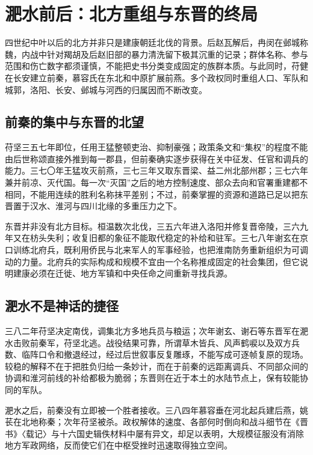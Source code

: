\section{淝水前后：北方重组与东晋的终局}
\label{sec:eastern-jin-fei-river-liu-yu}

四世纪中叶以后的北方并非只是建康朝廷北伐的背景。后赵瓦解后，冉闵在邺城称魏，内战中针对羯胡及后赵旧部的暴力清洗留下极其沉重的记录；群体名称、参与范围和伤亡数字都须谨慎，不能把史书分类变成固定的族群本质。与此同时，苻健在长安建立前秦，慕容氏在东北和中原扩展前燕。多个政权同时重组人口、军队和城郭，洛阳、长安、邺城与河西的归属因而不断改变。

\subsection{前秦的集中与东晋的北望}

苻坚三五七年即位，任用王猛整顿吏治、抑制豪强；政策条文和“集权”的程度不能由后世称颂直接外推到每一郡县，但前秦确实逐步获得在关中征发、任官和调兵的能力。三七〇年王猛攻灭前燕，三七三年又取东晋梁、益二州北部州郡；三七六年兼并前凉、灭代国。每一次“灭国”之后的地方控制速度、部众去向和官署重建都不相同，不能用连续的胜利名称抹平差别；不过，前秦掌握的资源和道路已足以把东晋置于汉水、淮河与四川北缘的多重压力之下。

东晋并非没有北方目标。桓温数次北伐，三五六年进入洛阳并修复晋帝陵，三六九年又在枋头失利；收复旧都的象征不能取代稳定的补给和驻军。三七八年谢玄在京口训练北府兵，既利用侨民与北来军人的军事经验，也把淮南防务重新组织为可调动的力量。北府兵的实际构成和规模不宜由一个名称推成固定的社会集团，但它说明建康必须在迁徙、地方军镇和中央任命之间重新寻找兵源。

\subsection{淝水不是神话的捷径}

三八二年苻坚决定南伐，调集北方多地兵员与粮运；次年谢玄、谢石等东晋军在淝水击败前秦军，苻坚北逃。战役结果可靠，所谓草木皆兵、风声鹤唳以及双方兵数、临阵口令和撤退经过，经过后世叙事反复雕琢，不能写成可逐帧复原的现场。较稳的解释不在于把胜负归给一条妙计，而在于前秦的远距离调兵、不同部众间的协调和淮河前线的补给都极为脆弱；东晋则在近于本土的水陆节点上，保有较能协同的军队。

淝水之后，前秦没有立即被一个胜者接收。三八四年慕容垂在河北起兵建后燕，姚苌在北地称秦；次年苻坚被杀。政权解体的速度、各部何时倒向和战斗细节在《晋书》〈载记〉与十六国史辑佚材料中屡有异文，却足以表明，大规模征服没有消除地方军政网络，反而使它们在中枢受挫时迅速取得独立空间。

